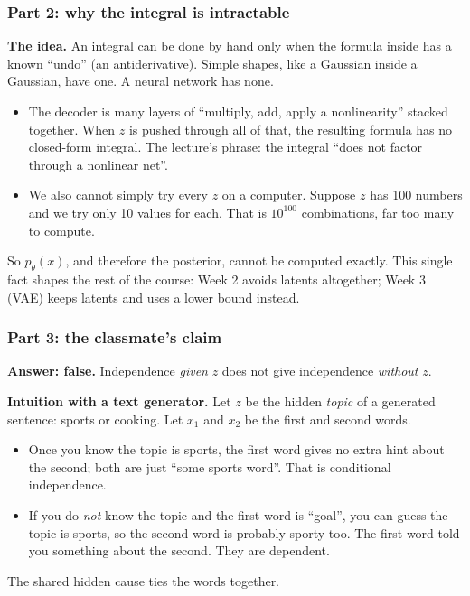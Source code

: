 \documentclass[12pt,a4paper]{article}
\begin{document}
\subsubsection{Part 2: why the integral is intractable}

\textbf{The idea.} An integral can be done by hand only when the formula inside has a known ``undo'' (an antiderivative). Simple shapes, like a Gaussian inside a Gaussian, have one. A neural network has none.

\begin{itemize}[leftmargin=*]
\item The decoder is many layers of ``multiply, add, apply a nonlinearity'' stacked together. When $z$ is pushed through all of that, the resulting formula has no closed-form integral. The lecture's phrase: the integral ``does not factor through a nonlinear net''.
\item We also cannot simply try every $z$ on a computer. Suppose $z$ has 100 numbers and we try only 10 values for each. That is $10^{100}$ combinations, far too many to compute.
\end{itemize}

So $p_\theta(x)$, and therefore the posterior, cannot be computed exactly. This single fact shapes the rest of the course: Week 2 avoids latents altogether; Week 3 (VAE) keeps latents and uses a lower bound instead.

\subsubsection{Part 3: the classmate's claim}

\textbf{Answer: false.} Independence \emph{given} $z$ does not give independence \emph{without} $z$.

\textbf{Intuition with a text generator.} Let $z$ be the hidden \emph{topic} of a generated sentence: sports or cooking. Let $x_1$ and $x_2$ be the first and second words.
\begin{itemize}[leftmargin=*]
\item Once you know the topic is sports, the first word gives no extra hint about the second; both are just ``some sports word''. That is conditional independence.
\item If you do \emph{not} know the topic and the first word is ``goal'', you can guess the topic is sports, so the second word is probably sporty too. The first word told you something about the second. They are dependent.
\end{itemize}
The shared hidden cause ties the words together.
\end{document}
